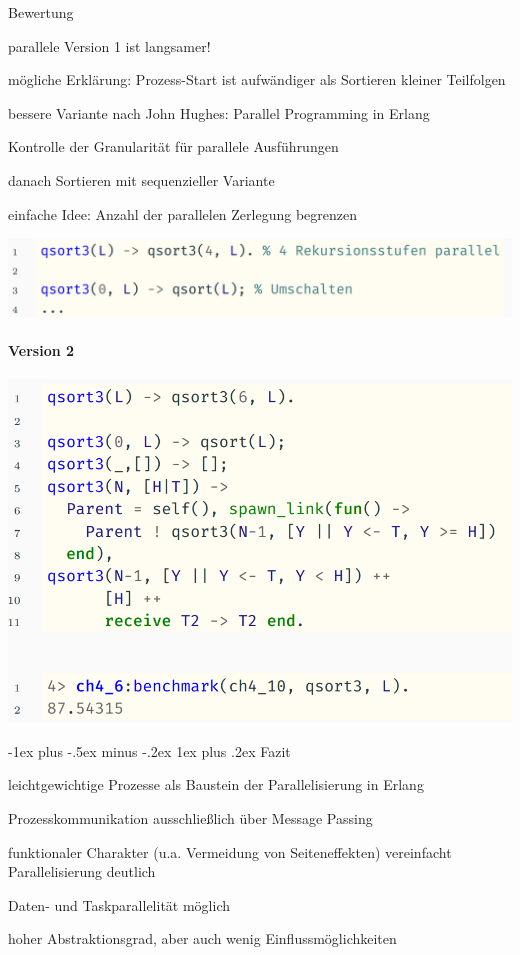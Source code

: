 \documentclass[10pt]{article}
\makeatletter
\renewcommand{\subsubsection}{\@startsection{subsubsection}{3}{0mm}%
                                {-1ex plus -.5ex minus -.2ex}%
                                {1ex plus .2ex}%
                                {\normalfont\small\bfseries}}
\makeatother
\begin{document}
  Bewertung
  \begin{itemize*}
    \item parallele Version 1 ist langsamer!
    \item mögliche Erklärung: Prozess-Start ist aufwändiger als Sortieren kleiner Teilfolgen
    \item bessere Variante nach John Hughes: Parallel Programming in Erlang
    \begin{itemize*}
      \item Kontrolle der Granularität für parallele Ausführungen
      \item danach Sortieren mit sequenzieller Variante
      \item einfache Idee: Anzahl der parallelen Zerlegung begrenzen
    \end{itemize*}
  \end{itemize*}
  \begin{center}
    \includegraphics[width=0.4\linewidth]{Assets/Programmierparadigmen-code-snippet-14}
  \end{center}
  
  \paragraph{Version 2}
  
  \begin{center}
    \includegraphics[width=0.4\linewidth]{Assets/Programmierparadigmen-code-snippet-15}
  \end{center}
  
  \subsubsection{Fazit}
  \begin{itemize*}
    \item \color{orange} leichtgewichtige Prozesse \color{black} als Baustein der Parallelisierung in Erlang
    \item Prozesskommunikation ausschließlich über \color{orange} Message Passing \color{black}
    \item \color{orange} funktionaler Charakter \color{black} (u.a. Vermeidung von Seiteneffekten) vereinfacht Parallelisierung deutlich
    \item \color{orange} Daten- und Taskparallelität \color{black} möglich
    \item hoher Abstraktionsgrad, aber auch wenig Einflussmöglichkeiten
  \end{itemize*}
  
\end{document}
